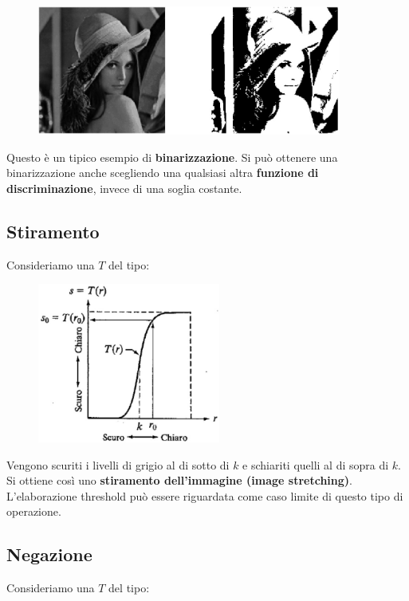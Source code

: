 \begin{figure}[H]
    \centering
    \includegraphics[width=10cm, keepaspectratio]{capitoli/immagini/imgs/foto_esempio_1.jpg}
\end{figure}

Questo è un tipico esempio di \textbf{binarizzazione}.
Si può ottenere una binarizzazione anche scegliendo una qualsiasi
altra \textbf{funzione di discriminazione}, invece di una soglia costante.

\subsection{Stiramento}

Consideriamo una $T$ del tipo:

\begin{figure}[H]
    \centering
    \includegraphics[width=6cm, keepaspectratio]{capitoli/immagini/imgs/trasformazione_esempio_2.jpg}
\end{figure}

Vengono scuriti i livelli di grigio al di sotto di $k$ e schiariti quelli al
di sopra di $k$. Si ottiene così uno \textbf{stiramento dell'immagine (image
    stretching)}. L'elaborazione threshold può essere riguardata come
caso limite di questo tipo di operazione.

\subsection{Negazione}

Consideriamo una $T$ del tipo:

